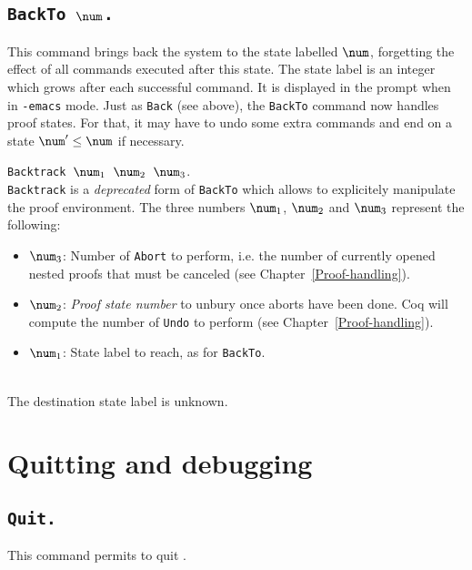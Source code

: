 \subsection[\tt BackTo $\num$.]{\tt BackTo $\num$.}
\label{sec:statenums}

This command brings back the system to the state labelled $\num$,
forgetting the effect of all commands executed after this state.
The state label is an integer which grows after each successful command.
It is displayed in the prompt when in \texttt{-emacs} mode.
Just as {\tt Back} (see above), the {\tt BackTo} command now handles
proof states. For that, it may have to undo some
extra commands and end on a state $\num' \leq \num$ if necessary.

\begin{Variants}
\item {\tt Backtrack $\num_1$ $\num_2$ $\num_3$}.\\
  {\tt Backtrack} is a \emph{deprecated} form of {\tt BackTo} which
  allows to explicitely manipulate the proof environment. The three
  numbers $\num_1$, $\num_2$ and $\num_3$ represent the following:
\begin{itemize}
\item $\num_3$: Number of \texttt{Abort} to perform, i.e. the number
  of currently opened nested proofs that must be canceled (see
  Chapter~\ref{Proof-handling}).
\item $\num_2$: \emph{Proof state number} to unbury once aborts have
  been done. Coq will compute the number of \texttt{Undo} to perform
  (see Chapter~\ref{Proof-handling}).
\item $\num_1$: State label to reach, as for {\tt BackTo}.
\end{itemize}
\end{Variants}

\begin{ErrMsgs}
\item {} \\
  The destination state label is unknown.
\end{ErrMsgs}

\section{Quitting and debugging}

\subsection[\tt Quit.]{\tt Quit.}
This command permits to quit \Coq.

